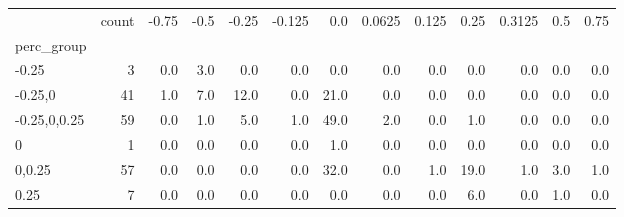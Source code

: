 \begin{tabular}{lrrrrrrrrrrrr}
\toprule
{} &  count &  -0.75 &  -0.5 &  -0.25 &  -0.125 &   0.0 &  0.0625 &  0.125 &  0.25 &  0.3125 &  0.5 &  0.75 \\
perc\_group   &        &        &       &        &         &       &         &        &       &         &      &       \\
\midrule
-0.25        &      3 &    0.0 &   3.0 &    0.0 &     0.0 &   0.0 &     0.0 &    0.0 &   0.0 &     0.0 &  0.0 &   0.0 \\
-0.25,0      &     41 &    1.0 &   7.0 &   12.0 &     0.0 &  21.0 &     0.0 &    0.0 &   0.0 &     0.0 &  0.0 &   0.0 \\
-0.25,0,0.25 &     59 &    0.0 &   1.0 &    5.0 &     1.0 &  49.0 &     2.0 &    0.0 &   1.0 &     0.0 &  0.0 &   0.0 \\
0            &      1 &    0.0 &   0.0 &    0.0 &     0.0 &   1.0 &     0.0 &    0.0 &   0.0 &     0.0 &  0.0 &   0.0 \\
0,0.25       &     57 &    0.0 &   0.0 &    0.0 &     0.0 &  32.0 &     0.0 &    1.0 &  19.0 &     1.0 &  3.0 &   1.0 \\
0.25         &      7 &    0.0 &   0.0 &    0.0 &     0.0 &   0.0 &     0.0 &    0.0 &   6.0 &     0.0 &  1.0 &   0.0 \\
\bottomrule
\end{tabular}
